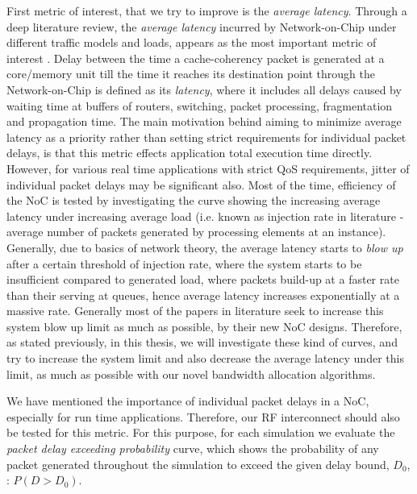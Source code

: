 First metric of interest, that we try to improve is the \textit{average latency}. Through a deep literature review, the \textit{average latency} incurred by Network-on-Chip under different traffic models and loads, appears as the most important metric of interest \cite{lee2007chip}\cite{marculescu2009outstanding}\cite{pestana2004cost}\cite{gratz2006implementation}\cite{more2013network}. Delay between the time a cache-coherency packet is generated at a core/memory unit till the time it reaches its destination point through the Network-on-Chip is defined as its \textit{latency}, where it includes all delays caused by waiting time at buffers of routers, switching, packet processing, fragmentation and propagation time. The main motivation behind aiming to minimize average latency as a priority rather than setting strict requirements for individual packet delays, is that this metric effects application total execution time directly. However, for various real time applications with strict QoS requirements, jitter of individual packet delays may be significant \cite{vellanki2004quality} also. Most of the time, efficiency of the NoC is tested by investigating the curve showing the increasing average latency under increasing average load (i.e. known as {injection rate} in literature - average number of packets generated by processing elements at an instance). Generally, due to basics of network theory, the average latency starts to \textit{blow up} after a certain threshold of injection rate, where the system starts to be insufficient compared to generated load, where packets build-up at a faster rate than their serving at queues, hence average latency increases exponentially at a massive rate. Generally most of the papers in literature seek to increase this system blow up limit as much as possible, by their new NoC designs. Therefore, as stated previously, in this thesis, we will investigate these kind of curves, and try to increase the system limit and also decrease the average latency under this limit, as much as possible with our novel bandwidth allocation algorithms. 

We have mentioned the importance of individual packet delays in a NoC, especially for run time applications. Therefore, our RF interconnect should also be tested for this metric. For this purpose, for each simulation we evaluate the \textit{packet delay exceeding probability} curve, which shows the probability of any packet generated throughout the simulation to exceed the given delay bound, $D_{0}$, : $P(D>D_{0})$. 
 
